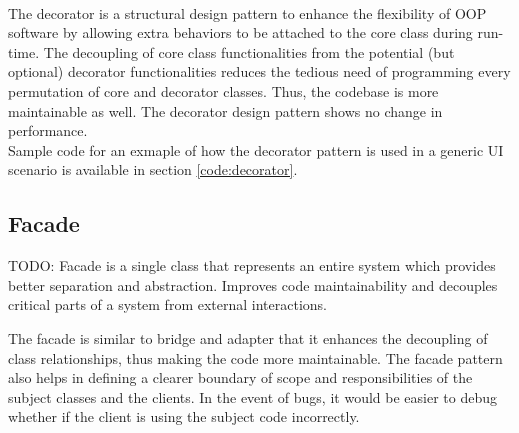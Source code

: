 \begin{multicols}{2}
\\
The decorator is a structural design pattern to enhance the flexibility of OOP software by allowing extra behaviors to be attached to the core class during run-time. The decoupling of core class functionalities from the potential (but optional) decorator functionalities reduces the tedious need of programming every permutation of core and decorator classes. Thus, the codebase is more maintainable as well. The decorator design pattern shows no change in performance.\bs
\\
Sample code for an exmaple of how the decorator pattern is used in a generic UI scenario is available in section \ref{code:decorator}.

\subsection{Facade}
TODO: Facade is a single class that represents an entire system which provides better separation and abstraction. Improves code maintainability and decouples critical parts of a system from external interactions.

The facade is similar to bridge and adapter that it enhances the decoupling of class relationships, thus making the code more maintainable. The facade pattern also helps in defining a clearer boundary of scope and responsibilities of the subject classes and the clients. In the event of bugs, it would be easier to debug whether if the client is using the subject code incorrectly.


\end{multicols}
